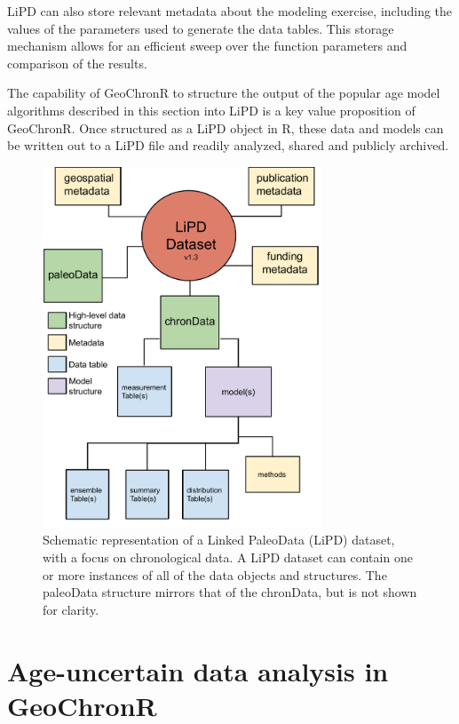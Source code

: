 \documentclass[gchron, manuscript]{copernicus}
\begin{document}
LiPD can also store relevant metadata about the modeling exercise, including the values of the parameters used to generate the data tables. This storage mechanism allows for an efficient sweep over the function parameters and comparison of the results.

The capability of GeoChronR to structure the output of the popular age model algorithms described in this section into LiPD is a key value proposition of GeoChronR.
Once structured as a LiPD object in R, these data and models can be written out to a LiPD file and readily analyzed, shared and publicly archived.

\begin{figure}
\includegraphics[width=8.3cm]{LPD schematic 1.3 - chronData} \caption{Schematic representation of a Linked PaleoData (LiPD) dataset, with a focus on chronological data. A LiPD dataset can contain one or more instances of all of the data objects and structures. The paleoData structure mirrors that of the chronData, but is not shown for clarity.}\label{fig:lipd-chron}
\end{figure}

\hypertarget{sec:age-uncertain-analysis}{%
\section{Age-uncertain data analysis in GeoChronR}\label{sec:age-uncertain-analysis}}
\end{document}
